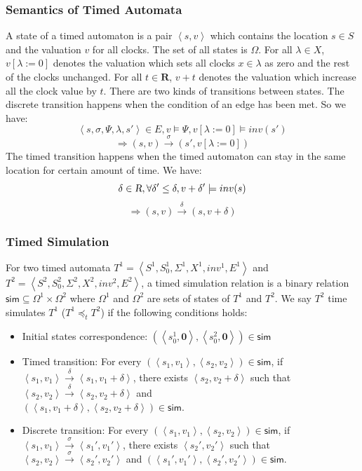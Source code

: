 \subsubsection{Semantics of Timed Automata}
A state of a timed automaton is a pair $\left\langle s,v\right\rangle$ which contains the location $s\in S$ and the valuation $v$ for all clocks. The set of all states is $\Omega$. For all $\lambda\in X$, $v[\lambda :=0]$ denotes the valuation which sets all clocks $x\in\lambda$ as zero and the rest of the clocks unchanged. For all $t\in \textbf{R}$, $v+t$ denotes the valuation which increase all the clock value by $t$. There are two kinds of transitions between states. The \textsf{discrete transition} happens when the condition of an edge has been met. So we have:
$$\left\langle s,\sigma,\Psi,\lambda,s'\right\rangle\in E,v\models \Psi,v[\lambda :=0]\models inv(s')$$
$$\Rightarrow (s,v)\xrightarrow{\sigma}(s',v[\lambda :=0])$$
The \textsf{timed transition} happens when the timed automaton can stay in the same location for certain amount of time. We have:
$$\delta\in \textsl{R},\forall \delta'\leq\delta, v+\delta'\models inv(s)$$
$$\Rightarrow (s,v)\xrightarrow{\delta}(s,v+\delta)$$
\subsubsection{Timed Simulation}
For two timed automata $T^1=\left\langle S^1,S_0^1,\Sigma^1,X^1,inv^1,E^1\right\rangle$ and $T^2=\left\langle S^2,S_0^2,\Sigma^2,X^2,inv^2,E^2\right\rangle$, a timed simulation relation is a binary relation $\textsf{sim}\subseteq \Omega^1\times \Omega^2$ where $\Omega^1$ and $\Omega^2$ are sets of states of $T^1$ and $T^2$. We say $T^2$ \textsf{time simulates} $T^1$ ($T^1 \preceq_t T^2$) if the following conditions holds:
\begin{itemize}
	\item Initial states correspondence: $(\left\langle s_0^1,\textbf{0}\right\rangle,\left\langle s_0^2,\textbf{0}\right\rangle)\in \textsf{sim}$
	\item Timed transition: For every $(\left\langle s_1,v_1\right\rangle,\left\langle s_2,v_2\right\rangle)\in\textsf{sim}$, if $\left\langle s_1,v_1\right\rangle\xrightarrow{\delta}\left\langle s_1,v_1+\delta\right\rangle$, there exists $\left\langle s_2,v_2+\delta\right\rangle$ such that $\left\langle s_2,v_2\right\rangle\xrightarrow{\delta}\left\langle s_2,v_2+\delta\right\rangle$ and \\$(\left\langle s_1,v_1+\delta\right\rangle,\left\langle s_2,v_2+\delta\right\rangle)\in\textsf{sim}$.
	\item Discrete transition: For every $(\left\langle s_1,v_1\right\rangle,\left\langle s_2,v_2\right\rangle)\in\textsf{sim}$, if $\left\langle s_1,v_1\right\rangle\xrightarrow{\sigma}\left\langle s_1',v_1'\right\rangle$, there exists $\left\langle s_2',v_2'\right\rangle$ such that $\left\langle s_2,v_2\right\rangle\xrightarrow{\sigma}\left\langle s_2',v_2'\right\rangle$ and $(\left\langle s_1',v_1'\right\rangle,\left\langle s_2',v_2'\right\rangle)\in\textsf{sim}$.
\end{itemize}

